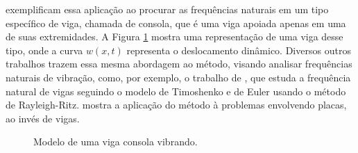 \documentclass[
	12pt,				%
	openright,			%
    twoside,			%
	a4paper,			%
	chapter=TITLE,		%
	english,			%
	french,				%
	spanish,			%
	brazil				%
	]{abntex2}
\numberwithin{lema}{chapter}
\numberwithin{teorema}{chapter}
\numberwithin{definicao}{chapter}
\numberwithin{exemplo}{chapter}
\numberwithin{figure}{chapter}
\begin{document}
 exemplificam essa aplicação ao procurar as frequências naturais em um tipo específico de viga, chamada de consola, que é uma viga apoiada apenas em uma de suas extremidades. A Figura \ref{fig:cantilever} mostra uma representação de uma viga desse tipo, onde a curva $w(x,t)$ representa o deslocamento dinâmico. Diversos outros trabalhos trazem essa mesma abordagem ao método, visando analisar frequências naturais de vibração, como, por exemplo, o trabalho de , que estuda a frequência natural de vigas seguindo o modelo de Timoshenko e de Euler usando o método de Rayleigh-Ritz.  mostra a aplicação do método à problemas envolvendo placas, ao invés de vigas.

\begin{figure}[h]
	\caption{Modelo de uma viga consola vibrando.}
	\centering
	\label{fig:cantilever}
\end{figure}
\end{document}
